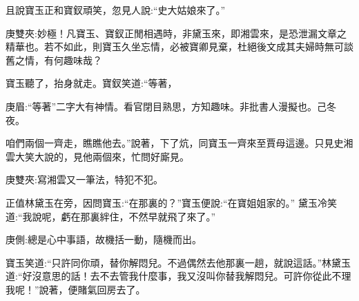 \begin{parag}
    且說寶玉正和寶釵頑笑，忽見人說:“史大姑娘來了。”\begin{note}庚雙夾:妙極！凡寶玉、寶釵正閒相遇時，非黛玉來，即湘雲來，是恐泄漏文章之精華也。若不如此，則寶玉久坐忘情，必被寶卿見棄，杜絕後文成其夫婦時無可談舊之情，有何趣味哉？\end{note}寶玉聽了，抬身就走。寶釵笑道:“等著，\begin{note}庚眉:“等著”二字大有神情。看官閉目熟思，方知趣味。非批書人漫擬也。己冬夜。\end{note}咱們兩個一齊走，瞧瞧他去。”說著，下了炕，同寶玉一齊來至賈母這邊。只見史湘雲大笑大說的，見他兩個來，忙問好廝見。\begin{note}庚雙夾:寫湘雲又一筆法，特犯不犯。\end{note}正值林黛玉在旁，因問寶玉:“在那裏的？”寶玉便說:“在寶姐姐家的。” 黛玉冷笑道:“我說呢，虧在那裏絆住，不然早就飛了來了。”\begin{note}庚側:總是心中事語，故機括一動，隨機而出。\end{note}寶玉笑道:“只許同你頑，替你解悶兒。不過偶然去他那裏一趟，就說這話。”林黛玉道:“好沒意思的話！去不去管我什麼事，我又沒叫你替我解悶兒。可許你從此不理我呢！”說著，便賭氣回房去了。
\end{parag}


